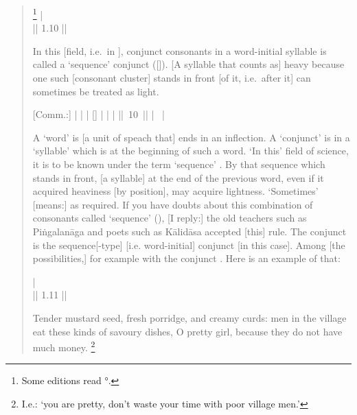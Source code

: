 \begin{quote}
%
                \footnote{Some editions read °.}
 | \\
 || 1.10 ||

In this [field, i.e.\ in ], conjunct consonants
 in a word-initial syllable  is
called a `sequence' conjunct ([]). 
[A syllable that counts as] heavy because one
such [consonant cluster] stands in front [of it, i.e.\ after it] can 
sometimes be treated as light.

{\footnotesize [Comm.:] 
 |
 |
 | 
[] | 
 | 
 |
||~10~||
 | 
~|

A `word' is [a unit of speach that] ends in an inflection. 
A `conjunct' is in a `syllable' which is
at the beginning of such a word. 
`In this' field of science, it is to be known under the 
term `sequence' \ie{\krama}. By that sequence which stands in front, 
[a syllable] at the end of the previous word, even if it acquired
heaviness [by position], may acquire lightness. `Sometimes' [means:]
as required.
If you have doubts about this combination of consonants called `sequence' (\krama),
[I reply:] the old teachers such as Pi\-ṅgalanāga and poets such as Kālidāsa
accepted [this] rule. The conjunct 
is the sequence[-type] \ie{\krama} [i.e. word-initial]
conjunct  [in this case].
Among [the possibilities,] for example with the conjunct .
Here is an example of that:}

 |\\
 || 1.11 ||

Tender mustard seed, fresh porridge, and creamy curds: men in the village eat
these kinds of savoury dishes, O pretty girl, because they do not have
much money.%
	\footnote{I.e.: `you are pretty, don't waste your time with poor village men.'}
\end{quote}

